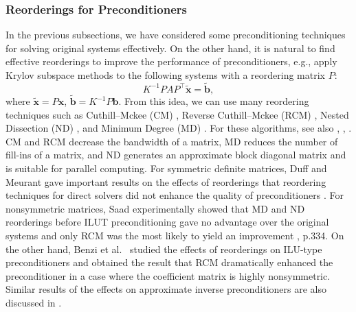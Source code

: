 \subsubsection{{Reorderings for Preconditioners}}\label{subsec:preconditioner-reorderings}
{In the previous subsections, we have considered some preconditioning techniques for solving original systems effectively. On the other hand, it is natural to find effective reorderings to improve the performance of preconditioners, e.g., apply Krylov subspace methods to the following systems with a reordering matrix $P$:}
\[K^{-1}PAP^{\top}\widetilde{\bm x}=\widetilde{\bm b},\]
{where $\widetilde{\bm x}=P\bm x$, $\widetilde{\bm b}=K^{-1}P\bm b$. From this idea, we can use many reordering techniques such as Cuthill--Mckee (CM) , Reverse Cuthill--Mckee (RCM) , Nested Dissection (ND) , and Minimum Degree (MD) . For these algorithms, see also , , . CM and RCM decrease the bandwidth of a matrix, MD reduces the number of fill-ins of a matrix, and ND generates an approximate block diagonal matrix and is suitable for parallel computing.}
{For symmetric definite matrices, Duff and Meurant gave important results on the effects of reorderings that reordering techniques for direct solvers did not enhance the quality of preconditioners .}
{For nonsymmetric matrices, Saad experimentally showed that MD and ND reorderings before ILUT preconditioning gave no advantage over the original systems and only RCM was the most likely to yield an improvement , p.334. On the other hand, Benzi et al.\  studied the effects of reorderings on ILU-type preconditioners and obtained the result that RCM dramatically enhanced the preconditioner in a case where the coefficient matrix is highly nonsymmetric. Similar results of the effects on approximate inverse preconditioners are also discussed in .}
